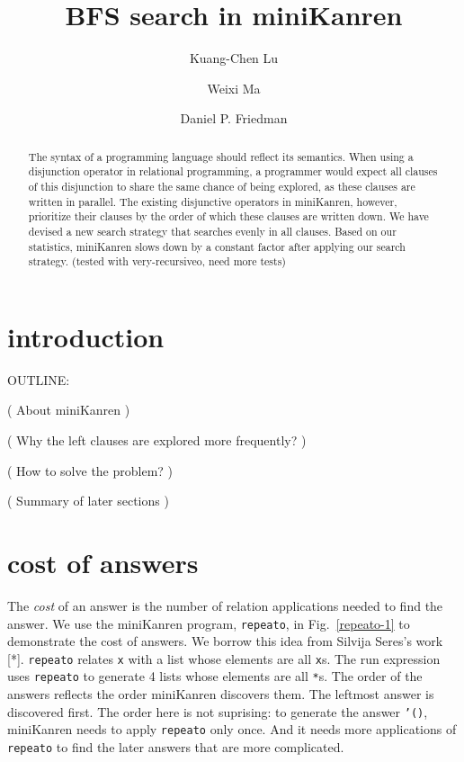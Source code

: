 \documentclass[format=acmlarge, review=true, authordraft=true]{acmart}
\title{BFS search in miniKanren}
\author{Kuang-Chen Lu}
\affiliation{Indiana University}
\author{Weixi Ma}
\affiliation{Indiana University}
\author{Daniel P. Friedman}
\affiliation{Indiana University}
\begin{document}
\begin{abstract}


The syntax of a programming language should reflect its semantics.
When using a disjunction operator in relational programming, a programmer would
expect all clauses of this disjunction to share the same chance of being explored,
as these clauses are written in parallel. The existing disjunctive operators in miniKanren,
however, prioritize their clauses by the order of which these clauses are written down.
We have devised a new search strategy that searches evenly in all clauses.
Based on our statistics, miniKanren slows down by a constant factor after applying our search strategy. (tested with very-recursiveo, need more tests)


\end{abstract}

\maketitle

\section{introduction}

OUTLINE:

( About miniKanren )

( Why the left clauses are explored more frequently? )

( How to solve the problem? )

( Summary of later sections )

\section{cost of answers}


The \emph{cost} of an answer is the number of relation applications needed to find the answer. We use the miniKanren program, \texttt{repeato}, in Fig.~\ref{repeato-1} to demonstrate the cost of answers. We borrow this idea from Silvija Seres's work [*]. \texttt{repeato} relates \texttt{x} with a list whose elements are all \texttt{x}s. The run expression uses \texttt{repeato} to generate 4 lists whose elements are all \texttt{*}s. The order of the answers reflects the order miniKanren discovers them. The leftmost answer is discovered first. The order here is not suprising: to generate the answer \texttt{'()}, miniKanren needs to apply \texttt{repeato} only once. And it needs more applications of \texttt{repeato} to find the later answers that are more complicated.
\end{document}
